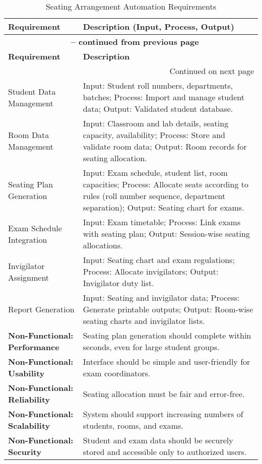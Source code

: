 \documentclass[12pt]{article}
\begin{document}
\begin{longtable}{|p{4cm}|p{11cm}|} 
\caption{Seating Arrangement Automation Requirements} \\ 
\hline 
\textbf{Requirement} & \textbf{Description (Input, Process, Output)} \\ 
\hline 
\endfirsthead 
\multicolumn{2}{c}{{\bfseries \tablename\ \thetable{} -- continued from previous page}} \\ 
\hline 
\textbf{Requirement} & \textbf{Description} \\ 
\hline 
\endhead 
\hline 
\multicolumn{2}{r}{{Continued on next page}} \\ 
\endfoot 
\hline 
\endlastfoot 

Student Data Management & Input: Student roll numbers, departments, batches; Process: Import and manage student data; Output: Validated student database. \\ 
\hline

Room Data Management & Input: Classroom and lab details, seating capacity, availability; Process: Store and validate room data; Output: Room records for seating allocation. \\ 
\hline

Seating Plan Generation & Input: Exam schedule, student list, room capacities; Process: Allocate seats according to rules (roll number sequence, department separation); Output: Seating chart for exams. \\ 
\hline

Exam Schedule Integration & Input: Exam timetable; Process: Link exams with seating plan; Output: Session-wise seating allocations. \\ 
\hline

Invigilator Assignment & Input: Seating chart and exam regulations; Process: Allocate invigilators; Output: Invigilator duty list. \\ 
\hline

Report Generation & Input: Seating and invigilator data; Process: Generate printable outputs; Output: Room-wise seating charts and invigilator lists. \\ 
\hline

\textbf{Non-Functional: Performance} & Seating plan generation should complete within seconds, even for large student groups. \\ 
\hline
\textbf{Non-Functional: Usability} & Interface should be simple and user-friendly for exam coordinators. \\ 
\hline
\textbf{Non-Functional: Reliability} & Seating allocation must be fair and error-free. \\ 
\hline
\textbf{Non-Functional: Scalability} & System should support increasing numbers of students, rooms, and exams. \\ 
\hline
\textbf{Non-Functional: Security} & Student and exam data should be securely stored and accessible only to authorized users. \\ 
\hline

\end{longtable}
\end{document}
